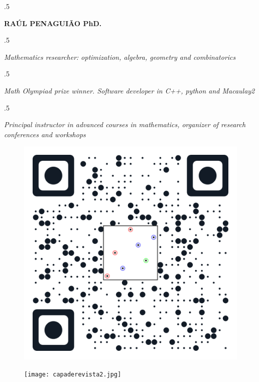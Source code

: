\documentclass[margin, 10pt]{res} %
\begin{document}

\moveleft.5\hoffset\centerline{{\Huge\bf RA\'UL PENAGUI\~AO PhD.}} %
\vspace{1.5mm}
\moveleft.5\hoffset\centerline{{\it Mathematics researcher: optimization, algebra, geometry and combinatorics}}

\moveleft.5\hoffset\centerline{{\it  Math Olympiad prize winner. Software developer in C++, python and Macaulay2}}

\moveleft.5\hoffset\centerline{{ \it Principal instructor in advanced courses in mathematics, organizer of research conferences and workshops}} %

\begin{figure}
\centering
\begin{minipage}{.5\textwidth}
  \centering
  \includegraphics[width=.4\linewidth, left]{websiteQRcode.png}
\end{minipage}%
\begin{minipage}{.5\textwidth}
  \centering
  \texttt{[image: capaderevista2.jpg]}
\end{minipage}
\end{figure}


 
\end{document}
